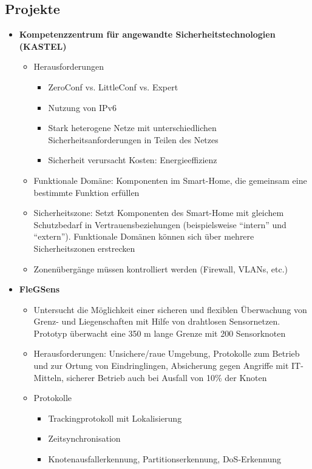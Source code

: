 \subsection{Projekte}
\begin{itemize}
	\item \textbf{Kompetenzzentrum für angewandte Sicherheitstechnologien (KASTEL)}
	\begin{itemize}
		\item Herausforderungen
		\begin{itemize}
			\item ZeroConf vs. LittleConf vs. Expert
			\item Nutzung von IPv6
			\item Stark heterogene Netze mit unterschiedlichen Sicherheitsanforderungen in Teilen des Netzes
			\item Sicherheit verursacht Kosten: Energieeffizienz
		\end{itemize}
		\item Funktionale Domäne: Komponenten im Smart-Home, die gemeinsam eine bestimmte Funktion erfüllen
		\item Sicherheitszone: Setzt Komponenten des Smart-Home mit gleichem Schutzbedarf in Vertrauensbeziehungen (beispielsweise "`intern"' und "`extern"'). Funktionale Domänen können sich über mehrere Sicherheitszonen erstrecken
		\item Zonenübergänge müssen kontrolliert werden (Firewall, VLANs, etc.)
	\end{itemize}
	\item \textbf{FleGSens}
	\begin{itemize}
		\item Untersucht die Möglichkeit einer sicheren und flexiblen Überwachung von Grenz- und Liegenschaften mit Hilfe von drahtlosen Sensornetzen. Prototyp überwacht eine 350 m lange Grenze mit 200 Sensorknoten
		\item Herausforderungen: Unsichere/raue Umgebung, Protokolle zum Betrieb und zur Ortung von Eindringlingen, Absicherung gegen Angriffe mit IT-Mitteln, sicherer Betrieb auch bei Ausfall von 10\% der Knoten
		\item Protokolle
		\begin{itemize}
			\item Trackingprotokoll mit Lokalisierung
			\item Zeitsynchronisation
			\item Knotenausfallerkennung, Partitionserkennung, DoS-Erkennung
		\end{itemize}
	\end{itemize}
\end{itemize}
